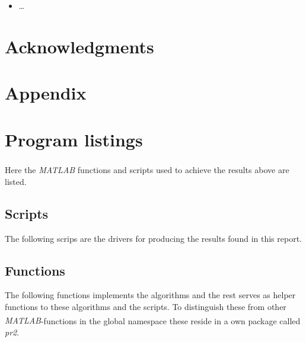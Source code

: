 \documentclass[10pt, a4paper]{article}
\newcommand{\matlab}{\small{\emph{MATLAB\textsuperscript{\textregistered}}}}
\begin{document}
\begin{itemize}
	\item \ldots
\end{itemize}


\section{Acknowledgments}

{}


\newpage
\section*{Appendix}
\appendix
\section{Program listings} \label{appendix+programs}
Here the \matlab{} functions and scripts used to achieve the results above are listed.

\subsection{Scripts}
The following scrips are the drivers for producing the results found in this report.



\subsection{Functions}
The following functions implements the algorithms and the rest serves as helper functions to these algorithms and the scripts. To distinguish these from other \matlab{}-functions in the global namespace these reside in a own package called \emph{pr2}.

%
\end{document}
